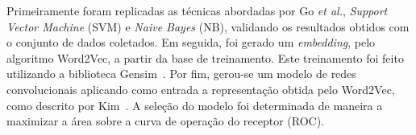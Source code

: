 Primeiramente foram replicadas as técnicas abordadas por Go \textit{et al.}, \textit{Support Vector Machine} (SVM) e
\textit{Naive Bayes} (NB), validando os resultados obtidos com o conjunto de dados coletados.
Em seguida, foi gerado um \textit{embedding}, pelo algoritmo Word2Vec, a partir da base de treinamento. Este treinamento
foi feito utilizando a biblioteca Gensim~\cite{gensim}.
Por fim, gerou-se um modelo de redes convolucionais aplicando como entrada a representação obtida pelo Word2Vec, como
descrito por Kim~\cite{kim14}.
A seleção do modelo foi determinada de maneira a maximizar a área sobre a curva de operação do receptor (ROC).
